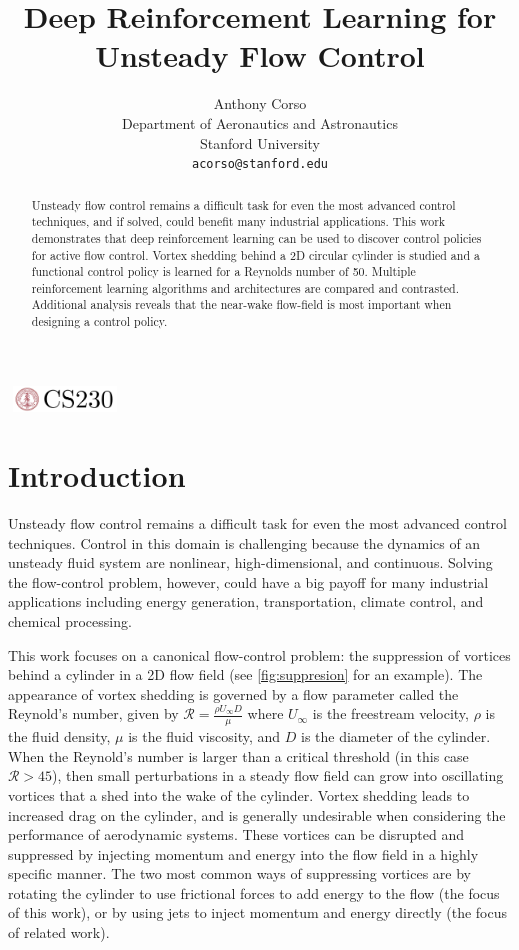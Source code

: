 \documentclass{article}
\title{\Large Deep Reinforcement Learning for Unsteady Flow Control}
\author{
  Anthony Corso \\
  Department of Aeronautics and Astronautics\\
  Stanford University\\
  \texttt{acorso@stanford.edu} \\
}
\begin{document}

\begin{center}
\includegraphics[width=3cm, height=0.7cm]{CS230}
\end{center}

\maketitle

\begin{abstract}
Unsteady flow control remains a difficult task for even the most advanced control techniques, and if solved, could benefit many industrial applications. This work demonstrates that deep reinforcement learning can be used to discover control policies for active flow control. Vortex shedding behind a 2D circular cylinder is studied and a functional control policy is learned for a Reynolds number of 50. Multiple reinforcement learning algorithms and architectures are compared and contrasted. Additional analysis reveals that the near-wake flow-field is most important when designing a control policy. 
\end{abstract}

\section{Introduction}	
Unsteady flow control remains a difficult task for even the most advanced control techniques. Control in this domain is challenging because the dynamics of an unsteady fluid system are nonlinear, high-dimensional, and continuous. Solving the flow-control problem, however, could have a big payoff for many industrial applications including energy generation, transportation, climate control, and chemical processing.

This work focuses on a canonical flow-control problem: the suppression of vortices behind a cylinder in a 2D flow field (see \cref{fig:suppresion} for an example). The appearance of vortex shedding is governed by a flow parameter called the Reynold's number, given by $ \mathcal{R} = \frac{\rho U_\infty D}{\mu}$ where $U_\infty$ is the freestream velocity, $\rho$ is the fluid density, $\mu$ is the fluid viscosity, and $D$ is the diameter of the cylinder. When the Reynold's number is larger than a critical threshold (in this case $\mathcal{R} > 45$), then small perturbations in a steady flow field can grow into oscillating vortices that a shed into the wake of the cylinder. Vortex shedding leads to increased drag on the cylinder, and is generally undesirable when considering the performance of aerodynamic systems. These vortices can be disrupted and suppressed by injecting momentum and energy into the flow field in a highly specific manner. The two most common ways of suppressing vortices are by rotating the cylinder to use frictional forces to add energy to the flow (the focus of this work), or by using jets to inject momentum and energy directly (the focus of related work).
\end{document}
